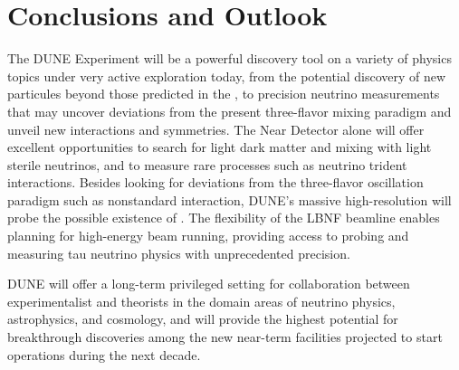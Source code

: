 \section{Conclusions and Outlook}
The DUNE Experiment will be a powerful discovery tool on a variety of physics topics under very active exploration today, from the potential discovery of new particules beyond those predicted in the , to precision neutrino measurements that may uncover deviations from the present three-flavor mixing paradigm and unveil new interactions and symmetries.
The Near Detector alone will offer excellent opportunities to search for light dark matter and mixing with light sterile neutrinos, and to measure rare processes such as neutrino trident interactions. Besides looking for deviations from the three-flavor oscillation paradigm such as nonstandard interaction, DUNE's massive high-resolution  will probe  the possible existence of . The flexibility of the LBNF beamline enables planning for high-energy beam running, providing access to probing and measuring tau neutrino physics with unprecedented precision.

DUNE will offer a long-term privileged setting for collaboration between experimentalist and theorists in the domain areas of neutrino physics, astrophysics, and cosmology, and will provide the highest potential for breakthrough discoveries among the new near-term facilities projected to start operations during the next decade.
